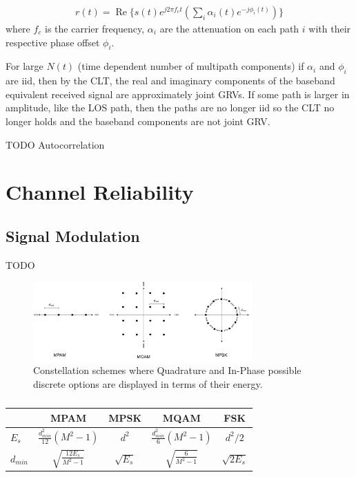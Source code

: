 \documentclass[12pt]{report} %
\begin{document}
\begin{align}
  r(t) = \operatorname{Re} \Biggl\{ s(t) e^{j2\pi f_c t} \left(\sum_i \alpha_i(t) e^{-j \phi_i(t)}\right) \Biggr\}
\end{align}
where $f_c$ is the carrier frequency, $\alpha_i$ are the attenuation on each path $i$ with their respective phase offset $\phi_i$.

For large $N(t)$ (time dependent number of multipath components) if $\alpha_i$ and $\phi_i$ are \gls{iid}, then by the \gls{CLT}, the real and imaginary components of the baseband equivalent received signal are approximately joint \glspl{GRV}. If some path is larger in amplitude, like the \gls{LOS} path, then the paths are no longer \gls{iid} so the \gls{CLT} no longer holds and the baseband components are not joint \gls{GRV}.

TODO Autocorrelation
\chapter{Channel Reliability}


\section{Signal Modulation}

TODO

\begin{figure}[t]
  \centering
  \includegraphics[width=0.75\textwidth]{figs/constellations.pdf}
  \caption{Constellation schemes where Quadrature and In-Phase possible discrete options are displayed in terms of their energy.}
  \label{fig:constellations}
\end{figure}

\begin{table}[htbp]
  \centering
  \caption{}
  \begin{tabular}{lcccc}                                                                                                                   \\
    \cmidrule(r){1-5}  & MPAM                           & MPSK                       & MQAM                         & FSK     \\
    \midrule $E_s$     & $\frac{d_{min}^2}{12}(M^2-1)$  & $d^2$                      & $\frac{d_{min}^2}{6}(M^2-1)$ & $d^2/2$ \\
    \midrule $d_{min}$ & $\sqrt{\frac{12E_s}{M^2 - 1}}$
                       & $\sqrt{E_s}$                   & $\sqrt{\frac{6}{M^2 - 1}}$ & $\sqrt{2 E_s}$                         \\

    \bottomrule
  \end{tabular}
  \label{tab:win-space-results}
\end{table}
\end{document}
